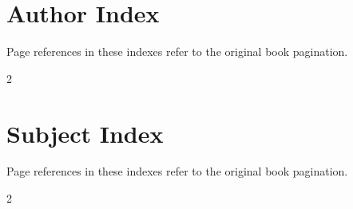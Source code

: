 \chapter{Author Index}
\label{chap:author-index}
Page references in these indexes refer to the original book pagination.
\begin{multicols}{2}
\small
\setlength{\parindent}{0pt}
\setlength{\parskip}{0pt}

\end{multicols}

\chapter{Subject Index}
\label{chap:subject-index}
Page references in these indexes refer to the original book pagination.
\begin{multicols}{2}
\small
\setlength{\parindent}{0pt}
\setlength{\parskip}{0pt}



\end{multicols}
